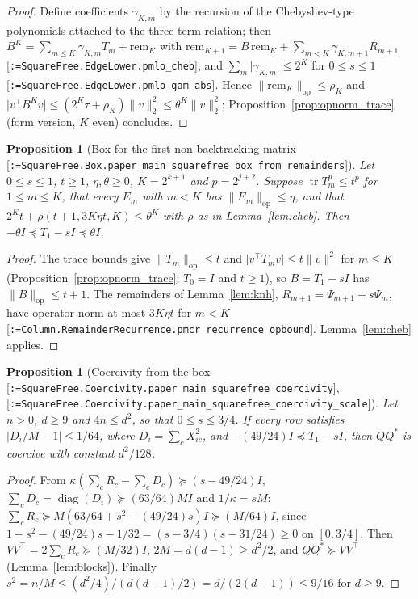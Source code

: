 \documentclass[11pt]{article}
\makeatletter
\newcommand{\formal@break}[1]{\@tfor\formal@tok:=#1\do{%
  \formal@tok
  \expandafter\ifx\formal@tok.\allowbreak\else
  \expandafter\ifx\formal@tok\_\allowbreak\fi\fi}}
\DeclareRobustCommand{\formal}[1]{\textnormal{[\texttt{\small\formal@break{#1}}]}}
\newcommand{\norm}[1]{\lVert #1\rVert}
\newcommand{\abs}[1]{\lvert #1\rvert}
\newcommand{\tr}{\operatorname{tr}}
\newcommand{\op}{\mathrm{op}}
\newcommand{\Id}{I}
\newcommand{\diag}{\operatorname{diag}}
\theoremstyle{plain}
\newtheorem{proposition}[theorem]{Proposition}
\theoremstyle{definition}
\makeatother
\begin{document}
\begin{proof}
Define coefficients $\gamma_{K,m}$ by the recursion of the Chebyshev-type
polynomials attached to the three-term relation; then
$B^K = \sum_{m\le K}\gamma_{K,m}T_m + \mathrm{rem}_K$ with
$\mathrm{rem}_{K+1} = B\,\mathrm{rem}_K + \sum_{m<K}\gamma_{K,m+1}R_{m+1}$
\formal{SquareFree.EdgeLower.pmlo\_cheb}, and $\sum_m\abs{\gamma_{K,m}} \le 2^K$
for $0 \le s \le 1$ \formal{SquareFree.EdgeLower.pmlo\_gam\_abs}. Hence
$\norm{\mathrm{rem}_K}_\op \le \rho_K$ and
$\abs{v^{\top}B^Kv} \le (2^K\tau + \rho_K)\norm{v}_2^2 \le \theta^K\norm{v}_2^2$;
Proposition~\ref{prop:opnorm_trace} (form version, $K$ even) concludes.
\end{proof}

\begin{proposition}[Box for the first non-backtracking matrix \formal{SquareFree.Box.paper\_main\_squarefree\_box\_from\_remainders}]\label{prop:nbbox}
Let $0 \le s \le 1$, $t \ge 1$, $\eta, \theta \ge 0$, $K = 2^{k+1}$ and
$p = 2^{j+2}$. Suppose $\tr T_m^p \le t^p$ for $1 \le m \le K$, that every
$E_m$ with $m < K$ has $\norm{E_m}_\op \le \eta$, and that
$2^Kt + \rho(t+1, 3K\eta t, K) \le \theta^K$ with $\rho$ as in Lemma~\ref{lem:cheb}.
Then $-\theta\Id \preceq T_1 - s\Id \preceq \theta\Id$.
\end{proposition}

\begin{proof}
The trace bounds give $\norm{T_m}_\op \le t$ and $\abs{v^{\top}T_mv} \le t\norm{v}^2$
for $m \le K$ (Proposition~\ref{prop:opnorm_trace}; $T_0 = \Id$ and $t \ge 1$),
so $B = T_1 - s\Id$ has $\norm{B}_\op \le t + 1$. The remainders of
Lemma~\ref{lem:knh}, $R_{m+1} = \Psi_{m+1} + s\Psi_m$, have operator norm at
most $3K\eta t$ for $m < K$ \formal{Column.RemainderRecurrence.pmcr\_recurrence\_opbound}.
Lemma~\ref{lem:cheb} applies.
\end{proof}

\begin{proposition}[Coercivity from the box \formal{SquareFree.Coercivity.paper\_main\_squarefree\_coercivity}, \formal{SquareFree.Coercivity.paper\_main\_squarefree\_coercivity\_scale}]\label{prop:coercive}
Let $n > 0$, $d \ge 9$ and $4n \le d^2$, so that $0 \le s \le 3/4$. If every
row satisfies $\abs{D_i/M - 1} \le 1/64$, where $D_i = \sum_cX_{ic}^2$, and
$-(49/24)\Id \preceq T_1 - s\Id$, then $QQ^{*}$ is coercive with constant
$d^2/128$.
\end{proposition}

\begin{proof}
From $\kappa(\sum_cR_c - \sum_cD_c) \succeq (s - 49/24)\Id$, $\sum_cD_c = \diag(D_i) \succeq (63/64)M\Id$
and $1/\kappa = sM$: $\sum_cR_c \succeq M(63/64 + s^2 - (49/24)s)\Id \succeq (M/64)\Id$,
since $1 + s^2 - (49/24)s - 1/32 = (s - 3/4)(s - 31/24) \ge 0$ on $[0, 3/4]$.
Then $VV^{\top} = 2\sum_cR_c \succeq (M/32)\Id$, $2M = d(d-1) \ge d^2/2$, and
$QQ^{*} \succeq VV^{\top}$ (Lemma~\ref{lem:blocks}). Finally
$s^2 = n/M \le (d^2/4)/(d(d-1)/2) = d/(2(d-1)) \le 9/16$ for $d \ge 9$.
\end{proof}
\end{document}
